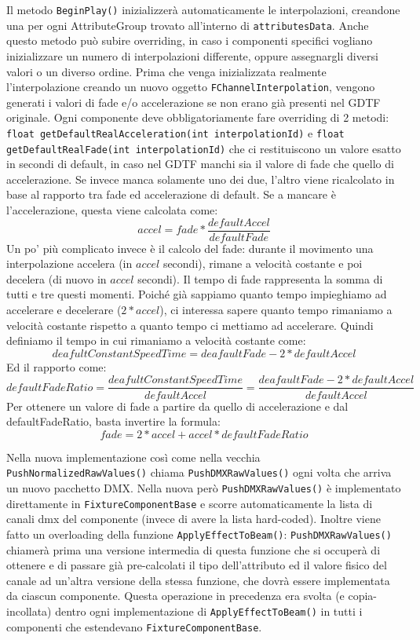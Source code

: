 \documentclass[main.tex]{subfiles}
\begin{document}
Il metodo \lstinline{BeginPlay()} inizializzerà automaticamente le interpolazioni, creandone una per ogni AttributeGroup trovato all'interno di \lstinline{attributesData}. Anche questo metodo può subire overriding, in caso i componenti specifici vogliano inizializzare un numero di interpolazioni differente, oppure assegnargli diversi valori o un diverso ordine. Prima che venga inizializzata realmente l'interpolazione creando un nuovo oggetto \lstinline{FChannelInterpolation}, vengono generati i valori di fade e/o accelerazione se non erano già presenti nel GDTF originale. Ogni componente deve obbligatoriamente fare overriding di 2 metodi: \lstinline{float getDefaultRealAcceleration(int interpolationId)} e \lstinline{float getDefaultRealFade(int interpolationId)} che ci restituiscono un valore esatto in secondi di default, in caso nel GDTF manchi sia il valore di fade che quello di accelerazione. Se invece manca solamente uno dei due, l'altro viene ricalcolato in base al rapporto tra fade ed accelerazione di default. Se a mancare è l'accelerazione, questa viene calcolata come:
\[accel = fade * \frac{defaultAccel}{defaultFade}\]
Un po' più complicato invece è il calcolo del fade: durante il movimento una interpolazione accelera (in $accel$ secondi), rimane a velocità costante e poi decelera (di nuovo in $accel$ secondi). Il tempo di fade rappresenta la somma di tutti e tre questi momenti. Poiché già sappiamo quanto tempo impieghiamo ad accelerare e decelerare ($2 * accel$), ci interessa sapere quanto tempo rimaniamo a velocità costante rispetto a quanto tempo ci mettiamo ad accelerare. Quindi definiamo il tempo in cui rimaniamo a velocità costante come:
\[deafultConstantSpeedTime = deafaultFade - 2 * defaultAccel\] 
Ed il rapporto come:
\[defaultFadeRatio = \frac{deafultConstantSpeedTime}{defaultAccel} = \frac{deafaultFade - 2 * defaultAccel}{defaultAccel}\]
Per ottenere un valore di fade a partire da quello di accelerazione e dal defaultFadeRatio, basta invertire la formula:
\[fade = 2 * accel + accel * defaultFadeRatio\]

Nella nuova implementazione così come nella vecchia \lstinline{PushNormalizedRawValues()} chiama \lstinline{PushDMXRawValues()} ogni volta che arriva un nuovo pacchetto DMX. Nella nuova però \lstinline{PushDMXRawValues()} è implementato direttamente in \lstinline{FixtureComponentBase} e scorre automaticamente la lista di canali dmx del componente (invece di avere la lista hard-coded). Inoltre viene fatto un overloading della funzione \lstinline{ApplyEffectToBeam()}: \lstinline{PushDMXRawValues()} chiamerà prima una versione intermedia di questa funzione che si occuperà di ottenere e di passare già pre-calcolati il tipo dell'attributo ed il valore fisico del canale ad un'altra versione della stessa funzione, che dovrà essere implementata da ciascun componente. Questa operazione in precedenza era svolta (e copia-incollata) dentro ogni implementazione di \lstinline{ApplyEffectToBeam()} in tutti i componenti che estendevano \lstinline{FixtureComponentBase}.
\end{document}
